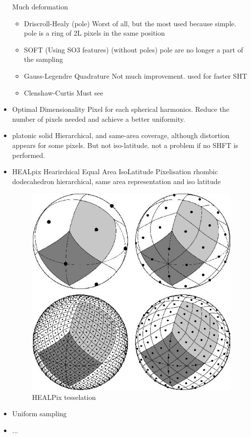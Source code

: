 \documentclass[11pt]{report}
\begin{document}
\begin{itemize}
    Much deformation
    \begin{itemize}
        \item Driscroll-Healy (pole)\cite{driscoll_computing_1994} %
        Worst of all, but the most used because simple.
        pole is a ring of 2L pixels in the same position
        \item SOFT (Using SO3 features) (without poles)\cite{healy_ffts_2003} %
        pole are no longer a part of the sampling
        \item Gauss-Legendre Quadrature \cite{keiner_fast_2008}
        Not much improvement. used for faster SHT
        \item Clenshaw-Curtis \cite{gimbutas_fast_2013}
        Must see 
    \end{itemize}
    \item Optimal Dimensionality \cite{elahi_comparative_2016} %
    Pixel for each spherical harmonics. Reduce the number of pixels needed and achieve a better uniformity.
    \item platonic solid %
    Hierarchical, and same-area coverage, although distortion appears for some pixels. But not iso-latitude. not a problem if no SHFT is performed.
    \item HEALpix \cite{noauthor_healpix_nodate}
    Hearirchical Equal Area IsoLatitude Pixelisation
    rhombic dodecahedron
    hierarchical, same area representation and iso latitude
    \begin{figure}[h!]
        \centering
        \includegraphics[width=0.5\linewidth]{gorski_f1.jpg}
        \caption{HEALPix tesselation}
        \label{fig:healpix}
    \end{figure}
    \item Uniform sampling
    \item ...
\end{itemize}
\end{document}
